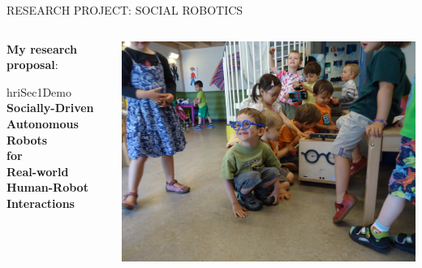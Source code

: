 \documentclass[xcolor=table]{beamer}
\begin{document}
\begin{frame}{RESEARCH PROJECT: SOCIAL ROBOTICS}
\begin{columns}
\begin{column}{0.7\linewidth}
{                \textbf{My research proposal}:

                \begin{beamercolorbox}[wd=\linewidth,ht=8ex,dp=0.7ex]{hriSec1Demo}
                    \large \bf \centering
                    Socially-Driven Autonomous Robots \\
                    for \\
                    Real-world Human-Robot Interactions
                \end{beamercolorbox}
            }

        \end{column}
        \begin{column}{0.3\linewidth}
            \begin{center}
                \includegraphics[trim=15cm 0 11cm 0,clip,width=\linewidth]{ranger/ranger_funny_glasses}
            \end{center}
        \end{column}
    \end{columns}


\end{frame}
\end{document}
